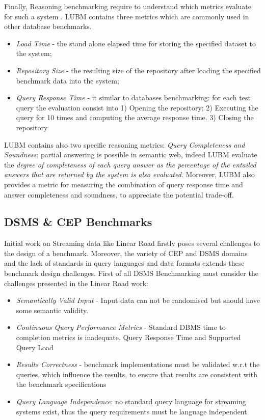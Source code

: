 Finally, Reasoning benchmarking require to understand which metrics evaluate for such a system \cite{Guo2005}. LUBM contains three metrics which are commonly used in other database benchmarks.\begin{itemize}
\item \textit{Load Time} - the stand alone elapsed time for storing the specified dataset to the system;
\item \textit{Repository Size} -  the resulting size of the repository after loading the specified benchmark data into the system;
\item \textit{Query Response Time} - it similar to databases benchmarking: for each test query the evaluation consist into
  	1) Opening the repository; 2) Executing the query for 10 times and computing the average response time. 3) Closing the repository
\end{itemize}

LUBM contains also two specific reasoning metrics: \textit{Query Completeness and Soundness}: partial answering is possible in semantic web, indeed LUBM evaluate the \textit{degree of completeness of each query answer as the percentage of the entailed answers that are returned by the system is also evaluated}. Moreover, LUBM also provides a metric for measuring the combination of  query response time and answer completeness and soundness, to  appreciate the potential trade-off.

\subsection{DSMS \& CEP Benchmarks}\label{sec:linear-road}

Initial work on Streaming data like Linear Road \cite{arasu2004linear} firstly poses  several challenges to the design of a benchmark.  Moreover, the variety of CEP and DSMS domains and the lack of standards in query languages and data formats extends these benchmark design challenges. First of all DSMS Benchmarking must consider the challenges presented in the Linear Road work:
\begin{itemize}
\item  \textit{Semantically Valid Input} -  Input data can not be randomised but should have some semantic validity.
\item  \textit{Continuous Query Performance Metrics} - Standard DBMS time to completion metrics is inadequate. Query Response Time and Supported Query Load 
\item  \textit{Results Correctness} - benchmark implementations must be validated w.r.t the queries, which influence the results, to ensure that results are consistent with the benchmark specifications 
\item  \textit{Query Language Independence}: no standard query language for streaming systems exist, thus the query requirements must be language independent
\end{itemize}

